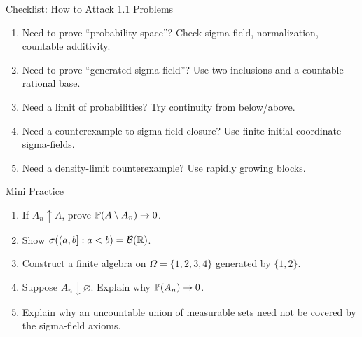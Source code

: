 \begin{frame}{Checklist: How to Attack 1.1 Problems}
  \begin{enumerate}
    \item Need to prove ``probability space''? Check sigma-field, normalization, countable additivity.
    \item Need to prove ``generated sigma-field''? Use two inclusions and a countable rational base.
    \item Need a limit of probabilities? Try continuity from below/above.
    \item Need a counterexample to sigma-field closure? Use finite initial-coordinate sigma-fields.
    \item Need a density-limit counterexample? Use rapidly growing blocks.
  \end{enumerate}
\end{frame}

\begin{frame}{Mini Practice}
  \begin{enumerate}
    \item If $A_n\uparrow A$, prove $\mathbb{P}(A\setminus A_n)\to0$.
    \item Show $\sigma((a,b]:a<b)=\mathcal{B}(\mathbb{R})$.
    \item Construct a finite algebra on $\Omega=\{1,2,3,4\}$ generated by $\{1,2\}$.
    \item Suppose $A_n\downarrow\varnothing$. Explain why $\mathbb{P}(A_n)\to0$.
    \item Explain why an uncountable union of measurable sets need not be covered by the sigma-field axioms.
  \end{enumerate}
\end{frame}


